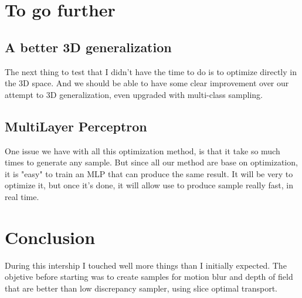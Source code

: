 \documentclass{classeENS}
\begin{document}
\section{To go further}

\subsection{A better 3D generalization}
    \> The next thing to test that I didn't have the time to do is to optimize directly 
    in the 3D space. And we should be able to have some clear improvement over our attempt
    to 3D generalization, even upgraded with multi-class sampling.

\subsection{MultiLayer Perceptron}
    One issue we have with all this optimization method, is that it take so much times
    to generate any sample. But since all our method are base on optimization, it is
    "easy" to train an MLP that can produce the same result. It will be very to
    optimize it, but once it's done, it will allow use to produce sample really fast,
    in real time.\\

\section{Conclusion}
    \> During this intership I touched well more things than I initially expected.
    The objetive before starting was to create samples for motion blur and depth of field
    that are better than low discrepancy sampler, using slice optimal transport.
\end{document}
